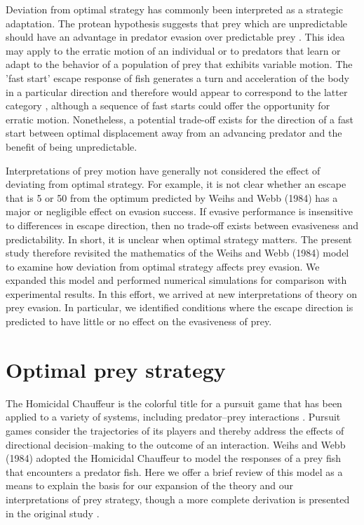\documentclass[12pt]{article}
\begin{document}
Deviation from optimal strategy has commonly been interpreted as a strategic adaptation. The protean hypothesis suggests that prey which are unpredictable should have an advantage in predator evasion over predictable prey \citep{Humphries:1970hy}. This idea may apply to the erratic motion of an individual or to predators that learn or adapt to the behavior of a population of prey that exhibits variable motion. The 'fast start' escape response of fish generates a turn and acceleration of the body in a particular direction and therefore would appear to correspond to the latter category \citep{D:1973up}, although a sequence of fast starts could offer the opportunity for erratic motion. Nonetheless, a potential trade-off exists for the direction of a fast start between optimal displacement away from an advancing predator and the benefit of being unpredictable.  

Interpretations of prey motion have generally not considered the effect of deviating from optimal strategy. For example, it is not clear whether an escape that is 5\textdegree\hspace{0.5pt} or 50\textdegree\hspace{0.5pt} from the optimum predicted by Weihs and Webb (1984) has a major or negligible effect on evasion success. If evasive performance is insensitive to differences in escape direction, then no trade-off exists between evasiveness and predictability. In short, it is unclear when optimal strategy matters. The present study therefore revisited the mathematics of the Weihs and Webb (1984) model to examine how deviation from optimal strategy affects prey evasion. We expanded this model and performed numerical simulations for comparison with experimental results. In this effort, we arrived at new interpretations of theory on prey evasion. In particular, we identified conditions where the escape direction is predicted to have little or no effect on the evasiveness of prey.

\section{Optimal prey strategy}
\label{opt_strategy}

The Homicidal Chauffeur is the colorful title for a pursuit game that has been applied to a variety of systems, including predator--prey interactions \citep{Isaacs:1965va}. Pursuit games consider the trajectories of its players and thereby address the effects of directional decision--making to the outcome of an interaction. Weihs and Webb (1984) adopted the Homicidal Chauffeur to model the responses of a prey fish that encounters a predator fish. Here we offer a brief review of this model as a means to explain the basis for our expansion of the theory and our interpretations of prey strategy, though a more complete derivation is presented in the original study \citep{Weihs:1984tb}.
\end{document}
